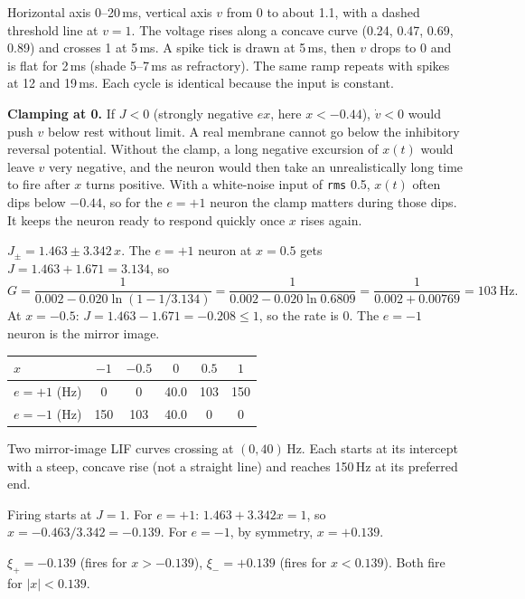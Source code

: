 \documentclass[10pt,letterpaper]{article}
\newcommand{\qsec}[1]{\vspace{8pt}{\large\bfseries #1}\par\vspace{2pt}}
\newcommand{\ans}[1]{\par\vspace{3pt}{\bfseries #1}\quad}
\begin{document}
\ans{2e.}
\begin{sketch}
Horizontal axis 0--20\,ms, vertical axis $v$ from 0 to about 1.1, with a dashed threshold line at $v = 1$. The voltage rises along a concave curve (0.24, 0.47, 0.69, 0.89) and crosses 1 at 5\,ms. A spike tick is drawn at 5\,ms, then $v$ drops to 0 and is flat for 2\,ms (shade 5--7\,ms as refractory). The same ramp repeats with spikes at 12 and 19\,ms. Each cycle is identical because the input is constant.
\end{sketch}
\textbf{Clamping at 0.} If $J < 0$ (strongly negative $e x$, here $x < -0.44$), $\dot v < 0$ would push $v$ below rest without limit. A real membrane cannot go below the inhibitory reversal potential. Without the clamp, a long negative excursion of $x(t)$ would leave $v$ very negative, and the neuron would then take an unrealistically long time to fire after $x$ turns positive. With a white-noise input of \texttt{rms} 0.5, $x(t)$ often dips below $-0.44$, so for the $e = +1$ neuron the clamp matters during those dips. It keeps the neuron ready to respond quickly once $x$ rises again.

\qsec{3. Two neurons with opposite encoders}

\ans{3a.}
$J_{\pm} = 1.463 \pm 3.342\,x$. The $e = +1$ neuron at $x = 0.5$ gets $J = 1.463 + 1.671 = 3.134$, so
\[
G = \frac{1}{0.002 - 0.020\ln(1 - 1/3.134)} = \frac{1}{0.002 - 0.020\ln 0.6809} = \frac{1}{0.002 + 0.00769} = 103\ \mathrm{Hz}.
\]
At $x = -0.5$: $J = 1.463 - 1.671 = -0.208 \le 1$, so the rate is $0$. The $e = -1$ neuron is the mirror image.

\begin{center}
\begin{tabular}{lccccc}
\toprule
$x$ & $-1$ & $-0.5$ & $0$ & $0.5$ & $1$ \\
\midrule
$e = +1$ (Hz) & 0 & 0 & 40.0 & 103 & 150 \\
$e = -1$ (Hz) & 150 & 103 & 40.0 & 0 & 0 \\
\bottomrule
\end{tabular}
\end{center}
\begin{sketch}
Two mirror-image LIF curves crossing at $(0, 40)$\,Hz. Each starts at its intercept with a steep, concave rise (not a straight line) and reaches 150\,Hz at its preferred end.
\end{sketch}

\ans{3b.}
Firing starts at $J = 1$. For $e = +1$: $1.463 + 3.342x = 1$, so $x = -0.463/3.342 = -0.139$. For $e = -1$, by symmetry, $x = +0.139$.
\begin{result}
$\xi_{+} = -0.139$ (fires for $x > -0.139$), $\xi_{-} = +0.139$ (fires for $x < 0.139$). Both fire for $|x| < 0.139$.
\end{result}
\end{document}
